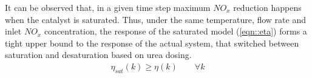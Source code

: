 It can be observed that, in a given time step maximum $NO_x$ reduction happens when the catalyst is saturated. Thus,
under the same temperature, flow rate and inlet $NO_x$ concentration, the response of the saturated model
(\ref{eqn::eta}) forms a tight upper bound to the response of the actual system, that switched between saturation and
desaturation based on urea dosing.
\begin{align}
        \eta_{sat}(k) \geq \eta(k) \qquad \forall k
        \label{eqn::eta_bound}
\end{align}
